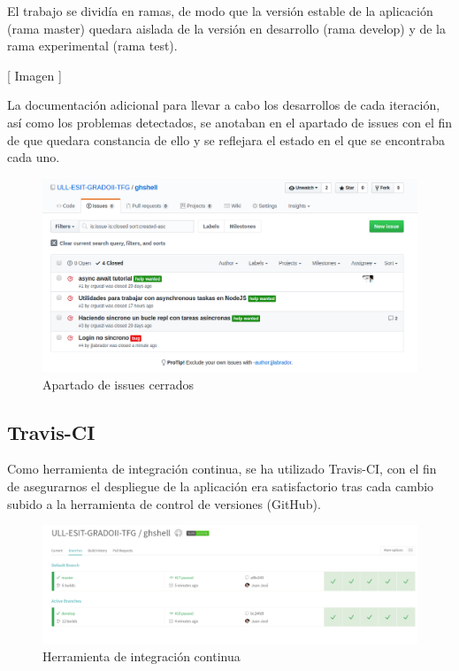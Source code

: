 El trabajo se dividía en ramas, de modo que la versión estable de la aplicación (rama master) quedara aislada de la 
versión en desarrollo (rama develop) y de la rama experimental (rama test).


[ Imagen ]


La documentación adicional para llevar a cabo los desarrollos de cada iteración, así como los problemas detectados, se anotaban en el apartado de issues con el fin de que quedara constancia de ello y se reflejara el estado en el que se encontraba cada uno.

\begin{figure}[H]
\begin{center}
\includegraphics[width=1\textwidth]{images/github3}
\caption{Apartado de issues cerrados}
\label{fig:github3}
\end{center}
\end{figure}

\subsection{Travis-CI}
\label{subsec:2.1.2}

Como herramienta de integración continua, se ha utilizado Travis-CI, con el fin de asegurarnos el despliegue de la aplicación era satisfactorio tras cada cambio subido a la herramienta de control de versiones (GitHub).

\begin{figure}[H]
\begin{center}
\includegraphics[width=1.1\textwidth]{images/travis-ci}
\caption{Herramienta de integración continua}
\label{fig:travisci}
\end{center}
\end{figure}


